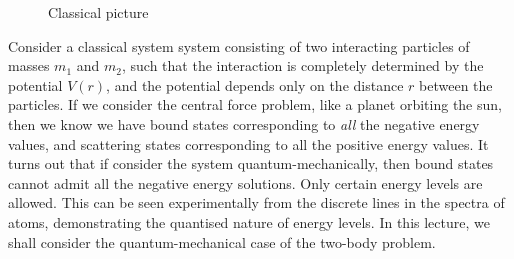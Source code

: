 \documentclass[12pt, a4 paper]{article}
\theoremstyle{definition}
\begin{document}
	\begin{figure}
	    \centering
		\caption*{\textsf{Classical picture}}\label{fig:twobody}
	\end{figure}
	Consider a classical system system consisting of two interacting particles of masses \(m_1\) and \(m_2\), such that the interaction is completely determined by the potential $V(r)$, and the potential depends only on the distance $r$ between the particles. If we consider the central force problem, like a planet orbiting the sun, then we know we have bound states corresponding to \textit{all} the negative energy values, and scattering states corresponding to all the positive energy values. It turns out that if consider the system quantum-mechanically, then bound states cannot admit all the negative energy solutions. Only certain energy levels are allowed. This can be seen experimentally from the discrete lines in the spectra of atoms, demonstrating the quantised nature of energy levels. In this lecture, we shall consider the quantum-mechanical case of the two-body problem.
\end{document}
